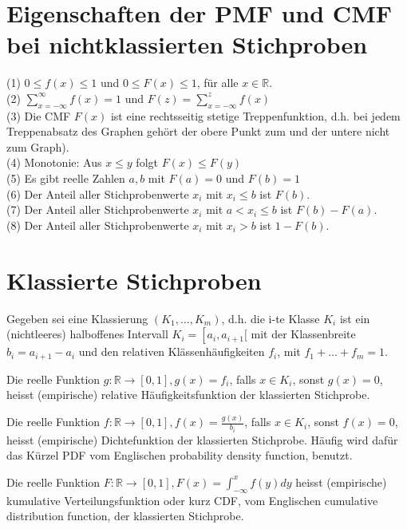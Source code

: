 \documentclass[10pt]{article}
\begin{document}
\section*{Eigenschaften der PMF und CMF bei nichtklassierten Stichproben}
(1) $0 \leq f(x) \leq 1$ und $0 \leq F(x) \leq 1$, für alle $x \in \mathbb{R}$.\\
(2) $\sum_{x=-\infty}^{\infty} f(x)=1$ und $F(z)=\sum_{x=-\infty}^{z} f(x)$\\
(3) Die CMF $F(x)$ ist eine rechtsseitig stetige Treppenfunktion, d.h. bei jedem Treppenabsatz des Graphen gehört der obere Punkt zum und der untere nicht zum Graph).\\
(4) Monotonie: Aus $x \leq y$ folgt $F(x) \leq F(y)$\\
(5) Es gibt reelle Zahlen $a, b$ mit $F(a)=0$ und $F(b)=1$\\
(6) Der Anteil aller Stichprobenwerte $x_{i}$ mit $x_{i} \leq b$ ist $F(b)$.\\
(7) Der Anteil aller Stichprobenwerte $x_{i}$ mit $a<x_{i} \leq b$ ist $F(b)-F(a)$.\\
(8) Der Anteil aller Stichprobenwerte $x_{i}$ mit $x_{i}>b$ ist $1-F(b)$.

\section*{Klassierte Stichproben}
Gegeben sei eine Klassierung $\left(K_{1}, \ldots, K_{m}\right)$, d.h. die i-te Klasse $K_{i}$ ist ein (nichtleeres) halboffenes Intervall $K_{i}=\left[a_{i}, a_{i+1}[\right.$ mit der Klassenbreite $b_{i}=a_{i+1}-a_{i}$ und den relativen Klässenhäufigkeiten $f_{i}$, mit $f_{1}+\ldots+f_{m}=1$.

Die reelle Funktion $g: \mathbb{R} \rightarrow[0,1], g(x)=f_{i}$, falls $x \in K_{i}$, sonst $g(x)=0$, heisst (empirische) relative Häufigkeitsfunktion der klassierten Stichprobe.

Die reelle Funktion $f: \mathbb{R} \rightarrow[0,1], f(x)=\frac{g(x)}{b_{i}}$, falls $x \in K_{i}$, sonst $f(x)=0$, heisst (empirische) Dichtefunktion der klassierten Stichprobe. Häufig wird dafür das Kürzel PDF vom Englischen probability density function, benutzt.

Die reelle Funktion $F: \mathbb{R} \rightarrow[0,1], F(x)=\int_{-\infty}^{x} f(y) d y$ heisst (empirische) kumulative Verteilungsfunktion oder kurz CDF, vom Englischen cumulative distribution function, der klassierten Stichprobe.
\end{document}

